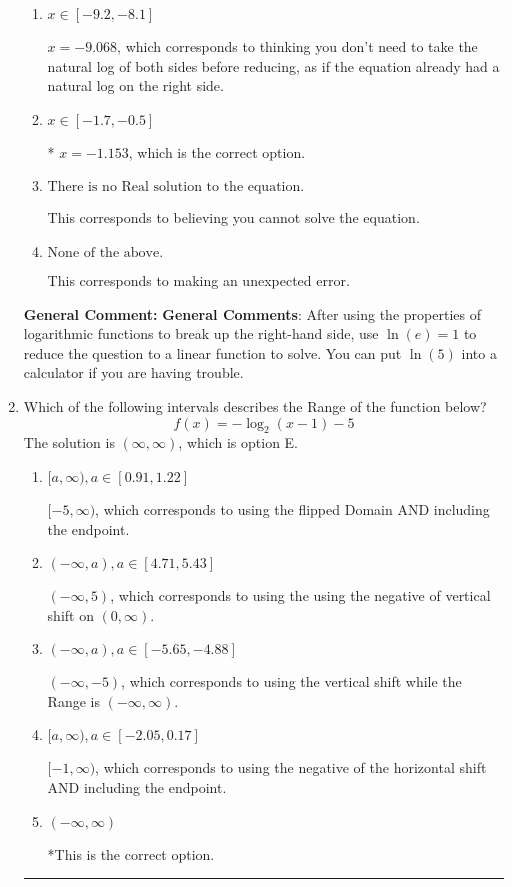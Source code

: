 \documentclass{extbook}[14pt]
\newcommand{\litem}[1]{\item #1

\rule{\textwidth}{0.4pt}}
\begin{document}
\begin{enumerate}
{\begin{enumerate}[label=\Alph*.]
$x = -0.487$, which corresponds to treating any root as a square root.
\item \( x \in [-9.2, -8.1] \)

$x = -9.068$, which corresponds to thinking you don't need to take the natural log of both sides before reducing, as if the equation already had a natural log on the right side.
\item \( x \in [-1.7, -0.5] \)

* $x = -1.153$, which is the correct option.
\item \( \text{There is no Real solution to the equation.} \)

This corresponds to believing you cannot solve the equation.
\item \( \text{None of the above.} \)

This corresponds to making an unexpected error.
\end{enumerate}

\textbf{General Comment:} \textbf{General Comments}: After using the properties of logarithmic functions to break up the right-hand side, use $\ln(e) = 1$ to reduce the question to a linear function to solve. You can put $\ln(5)$ into a calculator if you are having trouble.
}
\litem{
Which of the following intervals describes the Range of the function below?
\[ f(x) = -\log_2{(x-1)}-5 \]The solution is \( (\infty, \infty) \), which is option E.\begin{enumerate}[label=\Alph*.]
\item \( [a, \infty), a \in [0.91, 1.22] \)

$[-5, \infty)$, which corresponds to using the flipped Domain AND including the endpoint.
\item \( (-\infty, a), a \in [4.71, 5.43] \)

$(-\infty, 5)$, which corresponds to using the using the negative of vertical shift on $(0, \infty)$.
\item \( (-\infty, a), a \in [-5.65, -4.88] \)

$(-\infty, -5)$, which corresponds to using the vertical shift while the Range is $(-\infty, \infty)$.
\item \( [a, \infty), a \in [-2.05, 0.17] \)

$[-1, \infty)$, which corresponds to using the negative of the horizontal shift AND including the endpoint.
\item \( (-\infty, \infty) \)

*This is the correct option.
\end{enumerate}

}
\end{enumerate}
\end{document}
